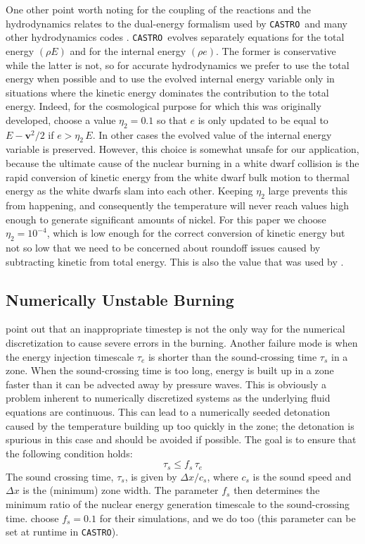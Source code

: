 \documentclass[twocolumn,numberedappendix]{../aastex6}
\newcommand{\castro}{\texttt{CASTRO}}
\begin{document}
One other point worth noting for the coupling of the reactions
and the hydrodynamics relates to the dual-energy formalism used
by \castro\ and many other hydrodynamics codes \cite{bryan:1995}.
\castro\ evolves separately equations for the total energy $(\rho E)$ and
for the internal energy $(\rho e)$. The former is conservative while the latter
is not, so for accurate hydrodynamics we prefer to use the total
energy when possible and to use the evolved internal energy variable
only in situations where the kinetic energy dominates the contribution
to the total energy. Indeed, for the cosmological purpose for which
this was originally developed, \cite{ENZO} choose a value $\eta_2 = 0.1$
so that $e$ is only updated to be equal to $E - \mathbf{v}^2/2$ if
$e > \eta_2\, E$. In other cases the evolved value of the internal
energy variable is preserved. However, this choice is somewhat unsafe
for our application, because the ultimate cause of the nuclear
burning in a white dwarf collision is the rapid conversion of
kinetic energy from the white dwarf bulk motion to thermal energy
as the white dwarfs slam into each other. Keeping $\eta_2$ large
prevents this from happening, and consequently the temperature
will never reach values high enough to generate significant
amounts of nickel. For this paper we choose $\eta_2 = 10^{-4}$,
which is low enough for the correct conversion of kinetic energy
but not so low that we need to be concerned about roundoff issues
caused by subtracting kinetic from total energy. This is also
the value that was used by \cite{hawley:2012}.

\subsection{Numerically Unstable Burning}
\label{sec:unstable_burning}

\citet{kushnir:2013} point out that an inappropriate timestep is 
not the only way for the numerical discretization to cause 
severe errors in the burning. Another failure mode is when
the energy injection timescale
$\tau_e$ is shorter than the sound-crossing time $\tau_s$ in a zone.
When the sound-crossing time is too long, energy is built up in
a zone faster than it can be advected away by pressure waves.
This is obviously a problem inherent to numerically discretized
systems as the underlying fluid equations are continuous.
This can lead to a numerically seeded detonation caused by the
temperature building up too quickly in the zone; the detonation
is spurious in this case and should be avoided if possible.
The goal is to ensure that the following condition holds:
\begin{equation}
  \tau_s \leq f_{s}\, \tau_e \label{eq:burning_limiter_2}
\end{equation}
The sound crossing time, $\tau_s$, is given by $\Delta x / c_s$, 
where $c_s$ is the sound speed and $\Delta x$ is the (minimum) 
zone width. The parameter $f_{s}$ then determines the minimum
ratio of the nuclear energy generation timescale to the 
sound-crossing time. \citet{kushnir:2013} choose $f_{s} = 0.1$ 
for their simulations, and we do too (this parameter can be set 
at runtime in \castro).
\end{document}

